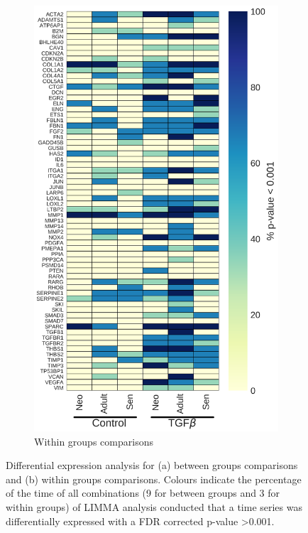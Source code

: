 \documentclass[alpha-refs]{wiley-article}
\begin{document}
\begin{figure}
\begin{subfigure}{0.45\linewidth}
		\includegraphics[height=0.7\textheight,width=\linewidth]{LIMMA09_2018/SavedObjects/pval_less_than_0_001/within_heatmap_0_001}
		\caption{Within groups comparisons}
		\label{fig:within:heatmap}
	\end{subfigure}
	\caption{Differential expression analysis for (a) between groups comparisons and (b) within groups comparisons. Colours indicate the percentage of the time of all combinations (9 for between groups and 3 for within groups) of LIMMA analysis conducted that a time series was differentially expressed with a FDR corrected p-value >0.001. }
	\label{fig:heatmap}
\end{figure}
\end{document}
